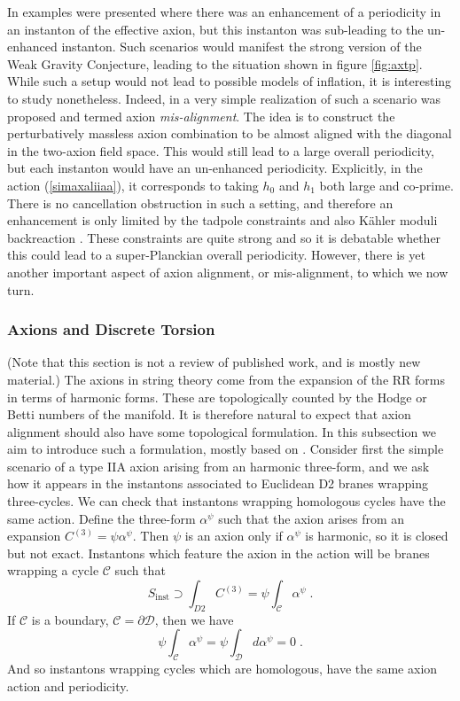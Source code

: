 \documentclass[11pt,a4paper]{article}
\numberwithin{equation}{section}
\numberwithin{table}{section}\setlength{\multlinegap}{25pt}
\newcommand{\cC}{\mathcal{C}}
\newcommand{\cD}{\mathcal{D}}
\newcommand{\be}{\begin{equation}}
\newcommand{\ee}{\end{equation}}
\begin{document}
In \cite{Palti:2015xra} examples were presented where there was an enhancement of a periodicity in an instanton of the effective axion, but this instanton was sub-leading to the un-enhanced instanton. Such scenarios would manifest the strong version of the Weak Gravity Conjecture, leading to the situation shown in figure \ref{fig:axtp}. While such a setup would not lead to possible models of inflation, it is interesting to study nonetheless. Indeed, in \cite{Hebecker:2018fln} a very simple realization of such a scenario was proposed and termed axion {\it mis-alignment}. The idea is to construct the perturbatively massless axion combination to be almost aligned with the diagonal in the two-axion field space. This would still lead to a large overall periodicity, but each instanton would have an un-enhanced periodicity. Explicitly, in the action (\ref{simaxaliiaa}), it corresponds to taking $h_0$ and $h_1$ both large and co-prime. There is no cancellation obstruction in such a setting, and therefore an enhancement is only limited by the tadpole constraints and also K{\"a}hler moduli backreaction \cite{Hebecker:2018fln}. These constraints are quite strong and so it is debatable whether this could lead to a super-Planckian overall periodicity. However, there is yet another important aspect of axion alignment, or mis-alignment, to which we now turn. 

\subsubsection*{Axions and Discrete Torsion}

(Note that this section is not a review of published work, and is mostly new material.) The axions in string theory come from the expansion of the RR forms in terms of harmonic forms. These are topologically counted by the Hodge or Betti numbers of the manifold. It is therefore natural to expect that axion alignment should also have some topological formulation. In this subsection we aim to introduce such a formulation, mostly based on \cite{hebunpub}. Consider first the simple scenario of a type IIA axion arising from an harmonic three-form, and we ask how it appears in the instantons associated to Euclidean D2 branes wrapping three-cycles. We can check that instantons wrapping homologous cycles have the same action. Define the three-form $\alpha^{\psi}$ such that the axion arises from an expansion $C^{(3)}=\psi \alpha^{\psi}$. Then $\psi$ is an axion only if $\alpha^{\psi}$ is harmonic, so it is closed but not exact. Instantons which feature the axion in the action will be branes wrapping a cycle $\cC$ such that
\be
S_{\mathrm{inst}} \supset \int_{D2} C^{(3)} = \psi \int_{\cC} \alpha^{\psi} \;.
\ee 
If $\cC$ is a boundary, $\cC = \partial \cD$, then we have 
\be
\psi  \int_{\cC} \alpha^{\psi} = \psi \int_{\cD} d \alpha^{\psi} = 0 \;.
\ee
And so instantons wrapping cycles which are homologous, have the same axion action and periodicity. 
\end{document}
